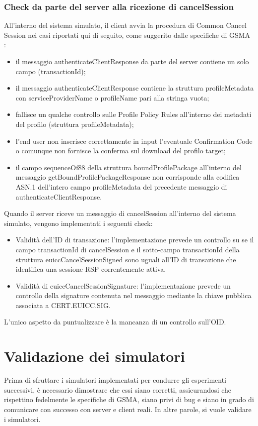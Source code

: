 \documentclass[10pt, oneside]{book}
\begin{document}
\subsubsection{Check da parte del server alla ricezione di cancelSession}
All'interno del sistema simulato, il client avvia la procedura di Common Cancel Session nei casi riportati qui di seguito, come suggerito dalle specifiche di GSMA \cite{GSMA-docs-new}:
\begin{itemize}
\item il messaggio authenticateClientResponse da parte del server contiene un solo campo (transactionId);
\item il messaggio authenticateClientResponse contiene la struttura profileMetadata con serviceProviderName o profileName pari alla stringa vuota;
\item fallisce un qualche controllo sulle Profile Policy Rules all'interno dei metadati del profilo (struttura profileMetadata);
\item l'end user non inserisce correttamente in input l'eventuale Confirmation Code o comunque non fornisce la conferma sul download del profilo target;
\item il campo sequenceOf88 della struttura boundProfilePackage all'interno del messaggio getBoundProfilePackageResponse non corrisponde alla codifica ASN.1 dell'intero campo profileMetadata del precedente messaggio di authenticateClientResponse.
\end{itemize}
Quando il server riceve un messaggio di cancelSession all'interno del sistema simulato, vengono implementati i seguenti check:
\begin{itemize}
\item Validità dell'ID di transazione: l'implementazione prevede un controllo su se il campo transactionId di cancelSession e il sotto-campo transactionId della struttura euiccCancelSessionSigned sono uguali all'ID di transazione che identifica una sessione RSP correntemente attiva.
\item Validità di euiccCancelSessionSignature: l'implementazione prevede un controllo della signature contenuta nel messaggio mediante la chiave pubblica associata a CERT.EUICC.SIG.
\end{itemize}
L'unico aspetto da puntualizzare è la mancanza di un controllo sull'OID.

\section{Validazione dei simulatori}
Prima di sfruttare i simulatori implementati per condurre gli esperimenti successivi, è necessario dimostrare che essi siano corretti, assicurandosi che rispettino fedelmente le specifiche di GSMA, siano privi di bug e siano in grado di comunicare con successo con server e client reali. In altre parole, si vuole validare i simulatori.
\end{document}
